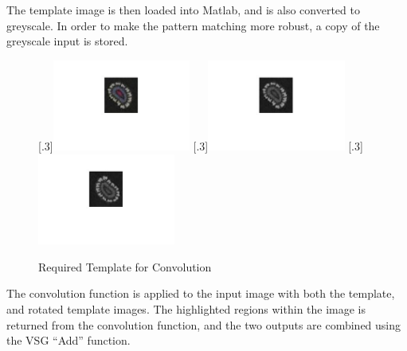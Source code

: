 \documentclass[a4paper]{article}
\begin{document}
	\par The template image is then loaded into Matlab, and is also
	converted to greyscale. In order to make the pattern matching more
	robust, a copy of the greyscale input is stored.
	\begin{figure}[H]
		\centering
		[.3\linewidth]{\includegraphics[height=3cm]{Results/Q3/a/qaTemplate.jpg}}%
		[.3\linewidth]{\includegraphics[height=3cm]{Results/Q3/a/qaTemplateGrey.jpg}}%
		[.3\linewidth]{\includegraphics[height=3cm]{Results/Q3/a/qaTemplateGreyRot.jpg}}%
		\caption{Required Template for Convolution}
		\label{fig:}
	\end{figure}
	\par The convolution function is applied to the input image with both
	the template, and rotated template images. The highlighted regions
	within the image is returned from the convolution function, and the two
	outputs are combined using the VSG ``Add'' function.
\end{document}
